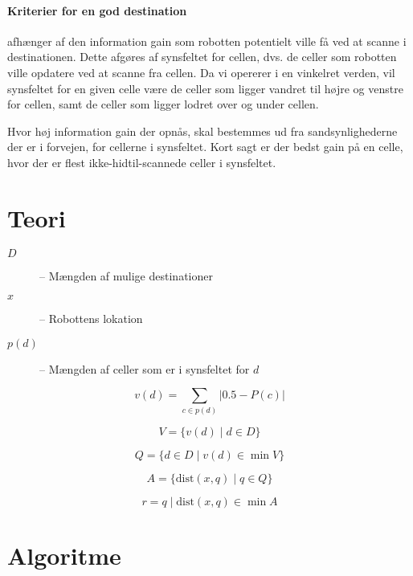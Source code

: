 \paragraph{Kriterier for en god destination} afhænger af den information gain som robotten potentielt ville få ved at scanne i destinationen.
Dette afgøres af synsfeltet for cellen, dvs. de celler som robotten ville opdatere ved at scanne fra cellen.
Da vi opererer i en vinkelret verden, vil synsfeltet for en given celle være de celler som ligger vandret til højre og venstre for cellen, samt de celler som ligger lodret over og under cellen.

Hvor høj information gain der opnås, skal bestemmes ud fra sandsynlighederne der er i forvejen, for cellerne i synsfeltet.
Kort sagt er der bedst gain på en celle, hvor der er flest ikke-hidtil-scannede celler i synsfeltet.

\section{Teori}
\begin{description}
\item[$D$]{-- Mængden af mulige destinationer}
\item[$x$]{-- Robottens lokation}
\item[$p(d)$]{-- Mængden af celler som er i synsfeltet for $d$}
\end{description}

\begin{equation}
v(d) = \sum_{c \in p(d)} |0.5 - P(c)|
\end{equation}

\begin{equation}
V = \{ v(d) \mid d \in D \}
\end{equation}

\begin{equation}
Q = \{ d \in D \mid v(d) \in \min V \}
\end{equation}

\begin{equation}
A = \{ \text{dist}(x,q) \mid q \in Q \}
\end{equation}

\begin{equation}
r =  q \mid \text{dist}(x,q) \in \min A
\end{equation}

\section{Algoritme}
\begin{algorithm}
\end{algorithm}

